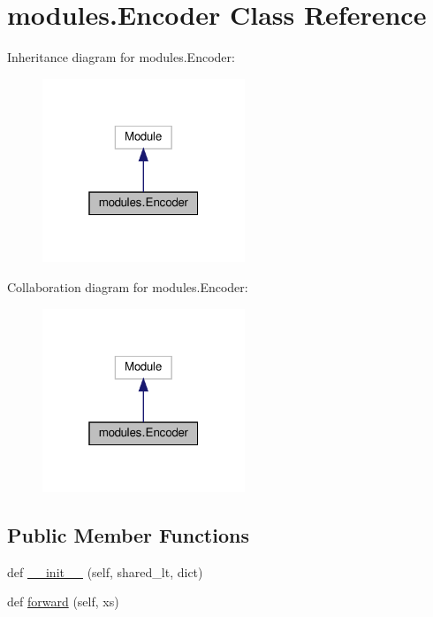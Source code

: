 \hypertarget{classmodules_1_1Encoder}{}\section{modules.\+Encoder Class Reference}
\label{classmodules_1_1Encoder}


Inheritance diagram for modules.\+Encoder\+:
\nopagebreak
\begin{figure}[H]
\begin{center}
\leavevmode
\includegraphics[width=172pt]{classmodules_1_1Encoder__inherit__graph}
\end{center}
\end{figure}


Collaboration diagram for modules.\+Encoder\+:
\nopagebreak
\begin{figure}[H]
\begin{center}
\leavevmode
\includegraphics[width=172pt]{classmodules_1_1Encoder__coll__graph}
\end{center}
\end{figure}
\subsection*{Public Member Functions}
\begin{DoxyCompactItemize}
\item 
def \hyperlink{classmodules_1_1Encoder_aedd78d6423ac096e5c1c9857c68c6c42}{\+\_\+\+\_\+init\+\_\+\+\_\+} (self, shared\+\_\+lt, dict)
\item 
def \hyperlink{classmodules_1_1Encoder_aeddb8f48da70ad07b3b86e3183eb87fa}{forward} (self, xs)
\end{DoxyCompactItemize}
